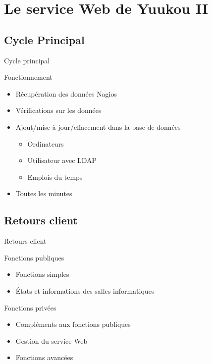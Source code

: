 \section{Le service Web de Yuukou II}

\subsection{Cycle Principal}

\begin{frame}{Cycle principal}
	\begin{block}{Fonctionnement}
		\begin{itemize}
			\item R\'ecup\'eration des donn\'ees Nagios
			\item V\'erifications sur les donn\'ees
			\item Ajout/mise \`a jour/effacement dans la base de donn\'ees
			\begin{itemize}
				\item Ordinateurs
				\item Utilisateur avec LDAP
				\item Emplois du temps
			
			\end{itemize}
			
			\item Toutes les minutes

		\end{itemize}

	\end{block}

\end{frame}


\subsection{Retours client}

\begin{frame}{Retours client}
	\begin{block}{Fonctions publiques}
		\begin{itemize}
			\item Fonctions simples
			\item \'Etats et informations des salles informatiques
			
		\end{itemize}

	\end{block}
	
	\begin{block}{Fonctions priv\'ees}
		\begin{itemize}
			\item Compl\'ements aux fonctions publiques
			\item Gestion du service Web 
			\item Fonctions avanc\'ees
			
		\end{itemize}

	\end{block}

\end{frame}


